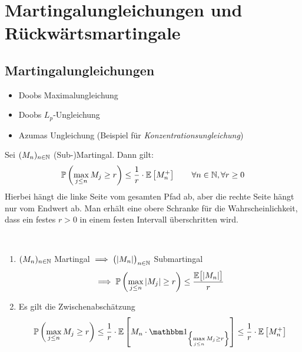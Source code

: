 
\chapter{Martingalungleichungen und Rückwärtsmartingale} %
\section{Martingalungleichungen} %
\begin{itemize}
	\item Doobs Maximalungleichung
	\item Doobs $L_p$-Ungleichung
	\item Azumas Ungleichung (Beispiel für \textit{Konzentrationsungleichung})
\end{itemize}

\setcounter{section}{5} %
\begin{theorem}\label{theorem5.1DoobMaximalungleichung}\enter
	Sei $(M_n)_{n\in\mathbb{N}}$ (Sub-)Martingal. Dann gilt:
	\begin{align*}
		\mathbb{P}\left(\max\limits_{j\leq n} M_j\geq r\right)\leq\frac{1}{r}\cdot\mathbb{E}\left[M_n^+\right]\qquad\forall n\in\mathbb{N},\forall r\geq0
	\end{align*}
	Hierbei hängt die linke Seite vom gesamten Pfad ab, aber die rechte Seite hängt nur vom Endwert ab.
	Man erhält eine obere Schranke für die Wahrscheinlichkeit, dass ein festes $r>0$ in einem festen Intervall überschritten wird.
\end{theorem}

\begin{bemerkung}\
	\begin{enumerate}[label=(\alph*)]
		\item $(M_n)_{n\in\mathbb{N}}$ Martingal $\implies\big(|M_n|\big)_{n\in\mathbb{N}}$ Submartingal
		\begin{align*}
			\implies\mathbb{P}\left(\max\limits_{j\leq n} |M_j|\geq r\right)\leq\frac{\mathbb{E}\big[|M_n|\big]}{r}
		\end{align*}
		\item Es gilt die Zwischenabschätzung
		\begin{align*}
			\P\left(\max\limits_{j\leq n} M_j\geq r\right)
			\leq
			\frac{1}{r}\cdot\E\left[M_n\cdot\indi_{\left\lbrace\max\limits_{j\leq n} M_j\geq r\right\rbrace}\right]
			\leq
			\frac{1}{r}\cdot\E\left[M_n^+\right]
		\end{align*}
	\end{enumerate}
\end{bemerkung}

